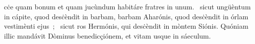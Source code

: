 \psalmChapterWithInscription{}
{ }
{%
cċe quam bonum et quam jucùndum habitáre fratres in unum. 
~sicut ungüèntum in cápite, quod desċèndit in barbam, barbam Aharónis, quod desċèndit in órlam vestimènti ejus~; 
~sicut ros Hermónis, qui desċèndit in mòntem Siónis. Quóniam illic mandávit Dòminus benedicçiónem, et vitam usque in sáeculum. 
}
